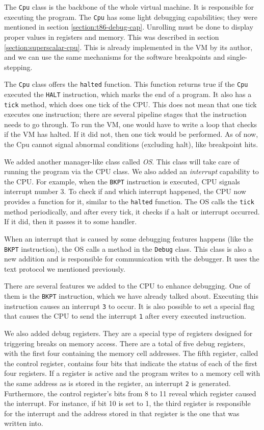 The \texttt{Cpu} class is the backbone of the whole virtual machine. It is
responsible for executing the program. The \texttt{Cpu} has some light
debugging capabilities; they were mentioned in section
\ref{section:t86-debug-cap}. Unrolling must be done to display proper values in
registers and memory. This was described in section
\ref{section:superscalar-cpu}. This is already implemented in the VM by its
author, and we can use the same mechanisms for the software breakpoints and
single-stepping.

The \texttt{Cpu} class offers the \texttt{halted} function. This function
returns true if the \texttt{Cpu} executed the \texttt{HALT} instruction, which
marks the end of a program. It also has a \texttt{tick} method, which does one
tick of the CPU. This does not mean that one tick executes one instruction;
there are several pipeline stages that the instruction needs to go through. To
run the VM, one would have to write a loop that checks if the VM has halted. If
it did not, then one tick would be performed. As of now, the Cpu cannot signal
abnormal conditions (excluding halt), like breakpoint hits.

We added another manager-like class called \textit{OS}. This class will take
care of running the program via the CPU class. We also added an
\textit{interrupt} capability to the CPU. For example, when the \texttt{BKPT}
instruction is executed, CPU signals interrupt number $3$. To check if and
which interrupt happened, the CPU now provides a function for it, similar to
the \texttt{halted} function. The OS calls the \texttt{tick} method
periodically, and after every tick, it checks if a halt or interrupt occurred.
If it did, then it passes it to some handler.

When an interrupt that is caused by some debugging features happens (like the
\texttt{BKPT} instruction), the OS calls a method in the \texttt{Debug} class.
This class is also a new addition and is responsible for communication with the
debugger. It uses the text protocol we mentioned previously.

There are several features we added to the CPU to enhance debugging. One of
them is the \texttt{BKPT} instruction, which we have already talked about.
Executing this instruction causes an interrupt \texttt{3} to occur. It is also
possible to set a special flag that causes the CPU to send the interrupt
\texttt{1} after every executed instruction. 

We also added debug registers. They are a special type of registers designed
for triggering breaks on memory access. There are a total of five debug
registers, with the first four containing the memory cell addresses. The fifth
register, called the control register, contains four bits that indicate the
status of each of the first four registers. If a register is active and the
program writes to a memory cell with the same address as is stored in the
register, an interrupt \texttt{2} is generated. Furthermore, the control
register's bits from 8 to 11 reveal which register caused the interrupt. For
instance, if bit 10 is set to 1, the third register is responsible for the
interrupt and the address stored in that register is the one that was written
into.

